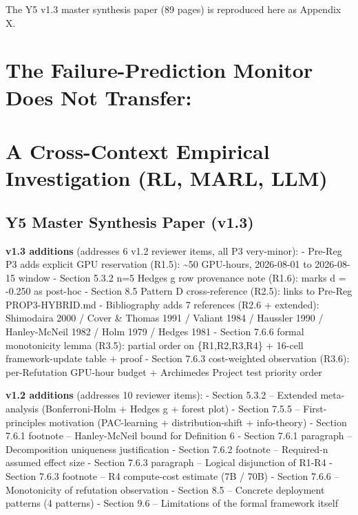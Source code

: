 \documentclass[11pt]{article}
\begin{document}
The Y5 v1.3 master synthesis paper (89 pages) is reproduced here as Appendix X.



{
\setcounter{tocdepth}{3}
\tableofcontents
}
\section{The Failure-Prediction Monitor Does Not
Transfer:}\label{the-failure-prediction-monitor-does-not-transfer}

\section{A Cross-Context Empirical Investigation (RL, MARL,
LLM)}\label{a-cross-context-empirical-investigation-rl-marl-llm}

\subsection{Y5 Master Synthesis Paper
(v1.3)}\label{y5-master-synthesis-paper-v1.3}

\textbf{v1.3 additions} (addresses 6 v1.2 reviewer items, all P3
very-minor): - Pre-Reg P3 adds explicit GPU reservation (R1.5):
\textasciitilde50 GPU-hours, 2026-08-01 to 2026-08-15 window - Section
5.3.2 n=5 Hedges g row provenance note (R1.6): marks d = -0.250 as
post-hoc - Section 8.5 Pattern D cross-reference (R2.5): links to
Pre-Reg PROP3-HYBRID.md - Bibliography adds 7 references (R2.6 +
extended): Shimodaira 2000 / Cover \& Thomas 1991 / Valiant 1984 /
Haussler 1990 / Hanley-McNeil 1982 / Holm 1979 / Hedges 1981 - Section
7.6.6 formal monotonicity lemma (R3.5): partial order on \{R1,R2,R3,R4\}
+ 16-cell framework-update table + proof - Section 7.6.3 cost-weighted
observation (R3.6): per-Refutation GPU-hour budget + Archimedes Project
test priority order

\textbf{v1.2 additions} (addresses 10 reviewer items): - Section 5.3.2
-- Extended meta-analysis (Bonferroni-Holm + Hedges g + forest plot) -
Section 7.5.5 -- First-principles motivation (PAC-learning +
distribution-shift + info-theory) - Section 7.6.1 footnote --
Hanley-McNeil bound for Definition 6 - Section 7.6.1 paragraph --
Decomposition uniqueness justification - Section 7.6.2 footnote --
Required-n assumed effect size - Section 7.6.3 paragraph -- Logical
disjunction of R1-R4 - Section 7.6.3 footnote -- R4 compute-cost
estimate (7B / 70B) - Section 7.6.6 -- Monotonicity of refutation
observation - Section 8.5 -- Concrete deployment patterns (4 patterns) -
Section 9.6 -- Limitations of the formal framework itself
\end{document}
